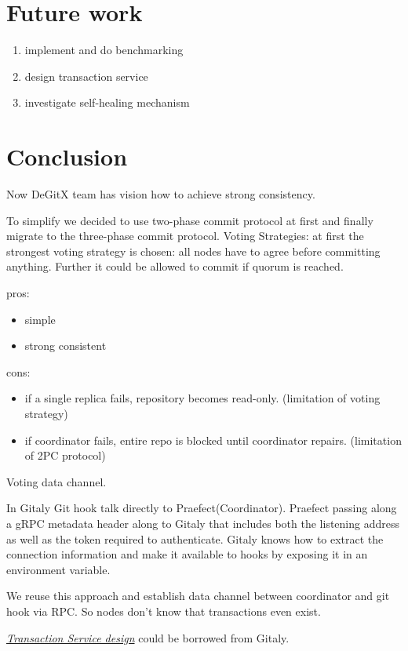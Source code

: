 \documentclass[acmlarge, screen, nonacm]{acmart}
\begin{document}
\section{Future work}

\begin{enumerate}
  \item implement and do benchmarking
  \item design transaction service
  \item investigate self-healing mechanism
\end{enumerate}

\section{Conclusion}

Now DeGitX team has vision how to achieve strong consistency.

To simplify we decided to use two-phase commit protocol at first and finally migrate to the three-phase commit protocol.
Voting Strategies: at first the strongest voting strategy is chosen:
all nodes have to agree before committing anything.
Further it could be allowed to commit if quorum is reached.

pros:
\begin{itemize}
  \item simple
  \item strong consistent
\end{itemize}

cons:
\begin{itemize}
  \item if a single replica fails, repository becomes read-only. (limitation of voting strategy)
  \item if coordinator fails, entire repo is blocked until coordinator repairs. (limitation of 2PC protocol)
\end{itemize}

Voting data channel.

In Gitaly Git hook talk directly to Praefect(Coordinator).
Praefect passing along a gRPC metadata header along
to Gitaly that includes both the listening address as well as the token required to authenticate.
Gitaly knows how to extract the connection information and make it available to hooks by exposing it in an environment variable.

We reuse this approach and establish data channel between coordinator and git hook via RPC\@.
So nodes don't know that transactions even exist.

\emph{\href{https://gitlab.com/gitlab-org/gitaly/-/blob/master/doc/design_ha.md\#transaction-service}{Transaction Service design}}
could be borrowed from Gitaly.
\end{document}
